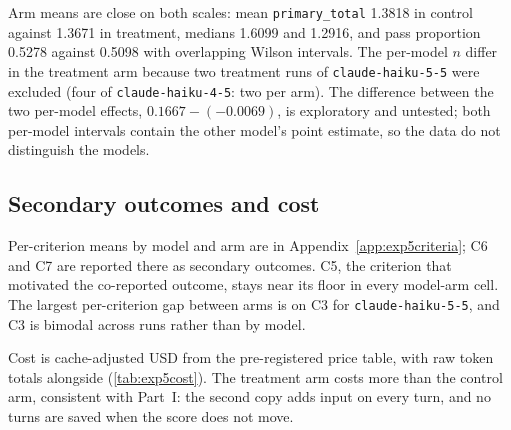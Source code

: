 \documentclass[11pt,a4paper]{article}
\newcommand{\inputexpfragment}[2]{%
  \begingroup
  \let\prexptabular\tabular
  \let\prexpmulticolumn\multicolumn
  \def\tabular##1{\prexptabular{#2}}%
  \def\multicolumn##1##2##3{\prexpmulticolumn{\the\numexpr##1-1\relax}{##2}{##3}}%
  \endgroup}
\begin{document}
\begin{table}[h]
\centering\small
\caption{\small \textbf{Pre-registered effect of prompt repetition per model (Experiment 5).} Fragment \texttt{tables/table\_effects.tex}, copied verbatim from the analysis output. Rank-biserial $r$ (treatment as $x$; positive favors treatment), two-sided Mann-Whitney $p$, seeded percentile bootstrap over 1000 resamples. Kept runs: 18 control and 18 treatment per \texttt{claude-haiku-4-5}; 18 control and 16 treatment per \texttt{claude-haiku-5-5}.}
\label{tab:exp5effects}
\inputexpfragment{tables/table_effects}{lrrrrrr}
\end{table}

\begin{table}[h]
\centering\small
\caption{\small \textbf{Primary and co-reported outcomes by arm, both models pooled (Experiment 5).} Fragment \texttt{tables/table\_means.tex}, copied verbatim from the analysis output. Pass is the proportion of C3, C4 and C5 values at or above 0.5 over all kept runs of the arm, with Wilson 95\% CI.}
\label{tab:exp5means}
\inputexpfragment{tables/table_means}{lrrrrrrrrr}
\end{table}

Arm means are close on both scales: mean \texttt{primary\_total} 1.3818 in control against 1.3671 in treatment, medians 1.6099 and 1.2916, and pass proportion 0.5278 against 0.5098 with overlapping Wilson intervals.
The per-model $n$ differ in the treatment arm because two treatment runs of \texttt{claude-haiku-5-5} were excluded (four of \texttt{claude-haiku-4-5}: two per arm).
The difference between the two per-model effects, $0.1667 - (-0.0069)$, is exploratory and untested; both per-model intervals contain the other model's point estimate, so the data do not distinguish the models.

\subsection{Secondary outcomes and cost}
\label{subsec:exp5cost}

Per-criterion means by model and arm are in Appendix~\ref{app:exp5criteria}; C6 and C7 are reported there as secondary outcomes.
C5, the criterion that motivated the co-reported outcome, stays near its floor in every model-arm cell.
The largest per-criterion gap between arms is on C3 for \texttt{claude-haiku-5-5}, and C3 is bimodal across runs rather than by model.

Cost is cache-adjusted USD from the pre-registered price table, with raw token totals alongside (\autoref{tab:exp5cost}).
The treatment arm costs more than the control arm, consistent with Part~I: the second copy adds input on every turn, and no turns are saved when the score does not move.
\end{document}
